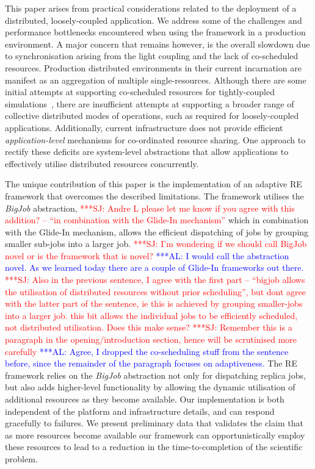 \documentclass{rspublic}
\newcommand{\alnote}[1]{ {\textcolor{blue} { ***AL: #1 }}}
\newcommand{\jhanote}[1]{ {\textcolor{red} { ***SJ: #1 }}}
\newcommand{\alnote}[1]{}
\newcommand{\jhanote}[1]{}
\begin{document}
This paper arises from practical considerations related to the
deployment of a distributed, loosely-coupled application.  We address
some of the challenges and performance bottlenecks encountered when
using the framework in a production environment.  A major concern that
remains however, is the overall slowdown due to synchronisation
arising from the light coupling and the lack of co-scheduled
resources. Production distributed environments in their current
incarnation are manifest as an aggregation of multiple
single-resources. Although there are some initial attempts at
supporting co-scheduled resources for tightly-coupled
simulations~\citep{repex_mpig}, there are insufficient attempts at
supporting a broader range of collective distributed modes of
operations, such as required for loosely-coupled applications.
Additionally, current infrastructure does not provide efficient {\it
application-level} mechanisms for co-ordinated resource sharing. One
approach to rectify these deficits are system-level abstractions that
allow applications to effectively utilise distributed resources
concurrently.

The unique contribution of this paper is the implementation of an
adaptive RE framework that overcomes the described limitations. The
framework utilises the \emph{BigJob} abstraction, \jhanote{Andre L
  please let me know if you agree with this addition? -- ``in
  combination with the Glide-In mechanism''} which in combination
with the Glide-In mechanism, allows the efficient dispatching
of jobs by grouping smaller sub-jobs
into a larger job. \jhanote{I'm wondering if we should call BigJob
  novel or is the framework that is
  novel?}  
\alnote{I would call the abstraction novel. As we learned today there
are a couple of Glide-In frameworks out there.} 
\jhanote{Also in the previous sentence, I agree with the first part --
  ``bigjob allows the utilisation of distributed resources without
  prior scheduling'', but dont agree with the latter part of the
  sentence, ie this is achieved by grouping smaller-jobs into a larger
  job. this bit allows the individual jobs to be efficiently
  scheduled, not distributed utilisation. Does this make sense?}  
\jhanote{Remember this is a paragraph in the opening/introduction
  section, hence will be scrutinised more carefully} 
\alnote{Agree, I dropped the co-scheduling stuff from the sentence before,
since the remainder of the paragraph focuses on adaptiveness.}  
The RE framework relies on the \emph{BigJob} abstraction not only for dispatching
replica jobs, but also adds higher-level functionality by allowing the
dynamic utilisation of additional resources as they become available.
Our implementation is both independent of the platform and
infrastructure details, and can respond gracefully to failures.  We
present preliminary data that validates the claim that as more
resources become available our framework can opportunistically employ
these resources to lead to a reduction in the time-to-completion of
the scientific problem.
\end{document}
